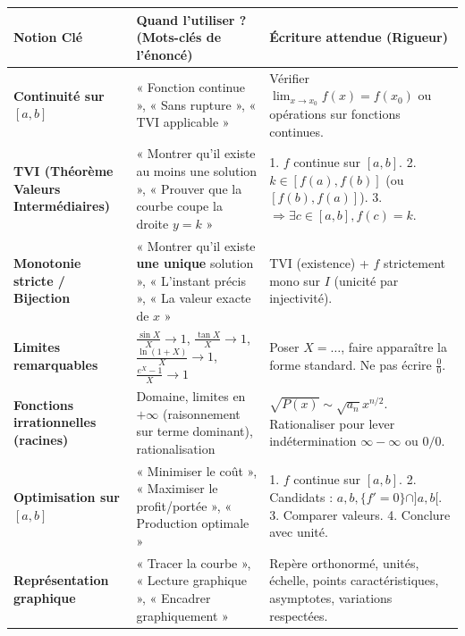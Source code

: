 \documentclass[11pt]{article}
\begin{document}
\begin{center}
\begin{tabularx}{\linewidth}{|l|X|X|}\hline
\rowcolor{popblueL} \textbf{Notion Clé} & \textbf{Quand l'utiliser ? (Mots-clés de l'énoncé)} & \textbf{Écriture attendue (Rigueur)} \\ \hline
\textbf{Continuité sur $[a,b]$} & « Fonction continue », « Sans rupture », « TVI applicable » & Vérifier $\lim_{x\to x_0} f(x) = f(x_0)$ ou opérations sur fonctions continues. \\ \hline
\textbf{TVI (Théorème Valeurs Intermédiaires)} & « Montrer qu'il existe au moins une solution », « Prouver que la courbe coupe la droite $y=k$ » & 1. $f$ continue sur $[a,b]$. 2. $k \in [f(a), f(b)]$ (ou $[f(b), f(a)]$). 3. $\Rightarrow \exists c \in [a,b], f(c)=k$. \\ \hline
\textbf{Monotonie stricte / Bijection} & « Montrer qu'il existe \textbf{une unique} solution », « L'instant précis », « La valeur exacte de $x$ » & TVI (existence) + $f$ strictement mono sur $I$ (unicité par injectivité). \\ \hline
\textbf{Limites remarquables} & $\frac{\sin X}{X} \to 1$, $\frac{\tan X}{X} \to 1$, $\frac{\ln(1+X)}{X} \to 1$, $\frac{e^X-1}{X} \to 1$ & Poser $X = \dots$, faire apparaître la forme standard. Ne pas écrire $\frac{0}{0}$. \\ \hline
\textbf{Fonctions irrationnelles (racines)} & Domaine, limites en $+\infty$ (raisonnement sur terme dominant), rationalisation & $\sqrt{P(x)} \sim \sqrt{a_n}x^{n/2}$. Rationaliser pour lever indétermination $\infty-\infty$ ou $0/0$. \\ \hline
\textbf{Optimisation sur $[a,b]$} & « Minimiser le coût », « Maximiser le profit/portée », « Production optimale » & 1. $f$ continue sur $[a,b]$. 2. Candidats : $a, b, \{f'=0\} \cap ]a,b[$. 3. Comparer valeurs. 4. Conclure avec unité. \\ \hline
\textbf{Représentation graphique} & « Tracer la courbe », « Lecture graphique », « Encadrer graphiquement » & Repère orthonormé, unités, échelle, points caractéristiques, asymptotes, variations respectées. \\ \hline
\end{tabularx}
\end{center}
\end{document}
